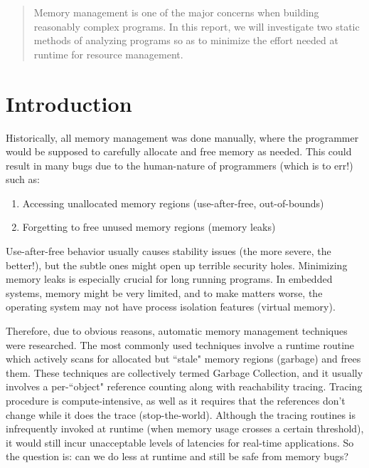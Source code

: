 \documentclass[11pt]{report}
\begin{document}
\begin{abstract}
    Memory management is one of the major concerns when building reasonably complex programs. In this report, we will investigate two static methods of analyzing programs so as to minimize the effort needed at runtime for resource management.
\end{abstract}

\tableofcontents

\chapter{Introduction}

Historically, all memory management was done manually, where the programmer would be supposed to carefully allocate and free memory as needed. This could result in many bugs due to the human-nature of programmers (which is to err!) such as:

\begin{enumerate}
\item Accessing unallocated memory regions (use-after-free, out-of-bounds)
\item Forgetting to free unused memory regions (memory leaks)
\end{enumerate}

Use-after-free behavior usually causes stability issues (the more severe, the better!), but the subtle ones might open up terrible security holes. Minimizing memory leaks is especially crucial for long running programs. In embedded systems, memory might be very limited, and to make matters worse, the operating system may not have process isolation features (virtual memory).

Therefore, due to obvious reasons, automatic memory management techniques were researched. The most commonly used techniques involve a runtime routine which actively scans for allocated but ``stale" memory regions (garbage) and frees them. These techniques are collectively termed Garbage Collection, and it usually involves a per-``object" reference counting along with reachability tracing. Tracing procedure is compute-intensive, as well as it requires that the references don’t change while it does the trace (stop-the-world). Although the tracing routines is infrequently invoked at runtime (when memory usage crosses a certain threshold), it would still incur unacceptable levels of latencies for real-time applications. So the question is: can we do less at runtime and still be safe from memory bugs?
\end{document}
